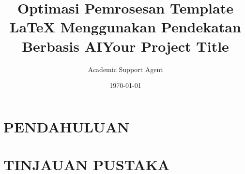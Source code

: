 \documentclass{article}
\title{Optimasi Pemrosesan Template LaTeX Menggunakan Pendekatan Berbasis AI}
\author{Academic Support Agent}
\date{\today}
\begin{document}
\maketitle

\begin{abstract}

\end{abstract}

\chapter{PENDAHULUAN}


\chapter{TINJAUAN PUSTAKA}


\setlength{\oddsidemargin}{0in}
\setlength{\evensidemargin}{0in}
\setlength{\textwidth}{6.5in}
\setlength{\parindent}{0in}
\setlength{\parskip}{\baselineskip}

\usepackage{amsmath,amsfonts,amssymb}

\title{Your Project Title}
\end{document}
